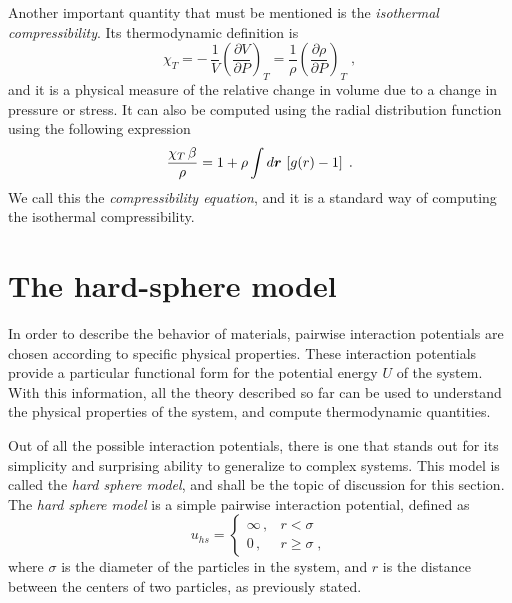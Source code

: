 Another important quantity that must be mentioned is the
\emph{isothermal compressibility}. Its thermodynamic definition
is~\cite{mcquarrieStatisticalMechanics2000}
\begin{equation}
    \chi_{T} = - \, \frac{1}{V} { \left( \frac{\partial V}{\partial P} \right) }_{T} =
    \frac{1}{\rho} { \left( \frac{\partial \rho}{\partial P} \right) }_{T}
    \; ,
    \label{eq:isothermal-chi}
\end{equation}
and it is a physical measure of the relative change in volume due to a change
in pressure or stress.
It can also be computed using the radial distribution function using the following
expression~\cite{hansenTheorySimpleLiquids2013}
\begin{equation}
    \frac{\chi_{T} \, \beta}{\rho} = 1 + \rho \int d \bm{r} \, \left[ g(r) - 1 \right]
    \; .
    \label{eq:chi-rdf}
\end{equation}
We call this the \emph{compressibility equation}, and it is a standard way of computing
the isothermal compressibility.

\section{The hard-sphere model} \label{sec:hard-sphere}
In order to describe the behavior of materials, pairwise interaction potentials are chosen 
according to specific physical properties. These interaction potentials provide a 
particular functional form for the potential energy $U$ of the system.
With this information, all the theory described so far can be used to understand the
physical properties of the system, and compute thermodynamic quantities.

Out of all the possible interaction potentials, there is one that stands out for its
simplicity and surprising ability to generalize to complex systems. This model is
called the \emph{hard sphere model}, and shall be the topic of discussion for this
section.
The \emph{hard sphere model} is a simple pairwise interaction potential, defined as
\begin{equation}
    u_{hs} = 
    \begin{cases}
        \infty \, , &r < \sigma \\
        0 \, , &r \geq \sigma \; ,
    \end{cases}
    \label{eq:hard-sphere}
\end{equation}
where $\sigma$ is the diameter of the particles in the system, and $r$ is the distance
between the centers of two particles, as previously stated.

